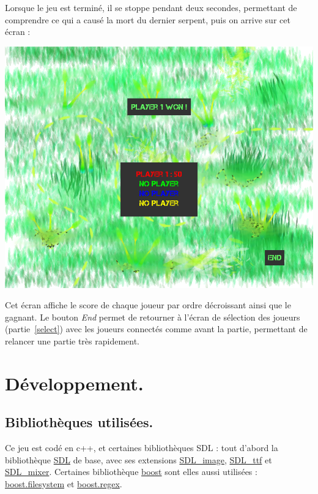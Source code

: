 \documentclass{article}
\begin{document}
Lorsque le jeu est terminé, il se stoppe pendant deux secondes, permettant de comprendre ce qui a causé la mort du dernier serpent, puis on arrive sur cet écran :
\begin{center}
	\includegraphics[scale=0.4]{img/game_over.png}
\end{center}
Cet écran affiche le score de chaque joueur par ordre décroissant ainsi que le gagnant. Le bouton \emph{End} permet de retourner à l'écran de sélection des joueurs (partie~\ref{select}) avec les joueurs connectés comme avant la partie, permettant de relancer une partie très rapidement.

\section{Développement.}
\subsection{Bibliothèques utilisées.}
Ce jeu est codé en c++, et certaines bibliothèques SDL : tout d'abord la bibliothèque \href{http://www.libsdl.org/}{SDL} de base, avec ses extensions \href{http://www.libsdl.org/projects/SDL\_image/}{SDL\_image}, \href{http://www.libsdl.org/projects/SDL\_ttf/}{SDL\_ttf} et \href{http://www.libsdl.org/projects/SDL\_mixer/}{SDL\_mixer}. Certaines bibliothèque \href{http://www.boost.org/}{boost} sont elles aussi utilisées : \href{http://www.boost.org/doc/libs/1\_39\_0/libs/filesystem/doc/index.htm}{boost.filesystem} et \href{http://www.boost.org/doc/libs/1\_53\_0/libs/regex/doc/html/index.html}{boost.regex}.
\end{document}
